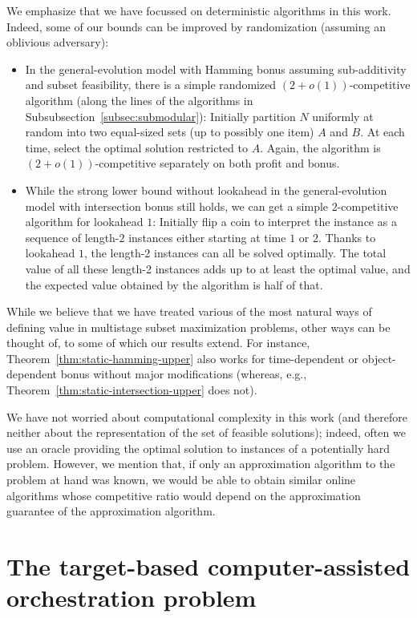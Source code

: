 \documentclass[a4paper]{book}
\newcommand{\finalversion}[1]{#1}
\begin{document}
We emphasize that we have focussed on deterministic algorithms in this work. Indeed, some of our bounds can be improved by randomization (assuming an oblivious adversary):
\begin{itemize}
    \item In the general-evolution model with Hamming bonus assuming \finalversion{sub-additivity} and subset feasibility, there is a simple randomized $(2+o(1))$-competitive algorithm (along the lines of the algorithms in Subsubsection~\ref{subsec:submodular}): Initially partition $N$ uniformly at random into two equal-sized sets (up to possibly one item) $A$ and $B$. At each time, select the optimal solution restricted to $A$. Again, the algorithm is $(2+o(1))$-competitive separately on both profit and bonus.
    \item While the strong lower bound without lookahead in the general-evolution model with intersection bonus still holds, we can get a simple $2$-competitive algorithm for lookahead $1$: Initially flip a coin to interpret the instance as a sequence of length-$2$ instances either starting at time $1$ or $2$. Thanks to lookahead $1$, the length-2 instances can all be solved optimally. The total value of all these length-2 instances adds up to at least the optimal value, and the expected value obtained by the algorithm is half of that.
\end{itemize}

While we believe that we have treated various of the most natural ways of defining value in multistage subset maximization problems, other ways can be thought of, to some of which our results extend. For instance, Theorem~\ref{thm:static-hamming-upper} also works for time-dependent or object-dependent bonus without major modifications (whereas, e.g., Theorem~\ref{thm:static-intersection-upper} does not).

We have not worried about computational complexity in this work (and therefore neither about the representation of the set of feasible solutions); indeed, often we use an oracle providing the optimal solution to instances of a potentially hard problem. However, we mention that, if only an approximation algorithm to the problem at hand was known, we would be able to obtain similar online algorithms whose competitive ratio would depend on the approximation guarantee of the approximation algorithm.

\chapter{The target-based computer-assisted orchestration problem}
\end{document}
